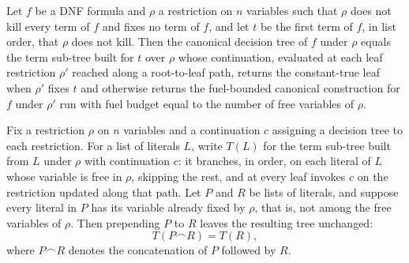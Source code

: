 \begin{lemma}
\label{SwitchingLemma.canonicalDTree_alive_eq_termSubTree'}
\leanok
{}
Let $f$ be a DNF formula and $\rho$ a restriction on $n$ variables such that $\rho$ does
not kill every term of $f$ and fixes no term of $f$, and let $t$ be the first term of
$f$, in list order, that $\rho$ does not kill. Then the canonical decision tree of $f$
under $\rho$ equals the term sub-tree built for $t$ over $\rho$ whose continuation,
evaluated at each leaf restriction $\rho'$ reached along a root-to-leaf path, returns
the constant-true leaf when $\rho'$ fixes $t$ and otherwise returns the fuel-bounded
canonical construction for $f$ under $\rho'$ run with fuel budget equal to the number of
free variables of $\rho$.
\end{lemma}

\begin{lemma}
\label{SwitchingLemma.termSubTree_skip_nonfree_prefix'}
\leanok
{}
Fix a restriction $\rho$ on $n$ variables and a continuation $c$ assigning a decision
tree to each restriction. For a list of literals $L$, write $T(L)$ for the term sub-tree
built from $L$ under $\rho$ with continuation $c$: it branches, in order, on each
literal of $L$ whose variable is free in $\rho$, skipping the rest, and at every leaf
invokes $c$ on the restriction updated along that path. Let $P$ and $R$ be lists of
literals, and suppose every literal in $P$ has its variable already fixed by $\rho$,
that is, not among the free variables of $\rho$. Then prepending $P$ to $R$ leaves the
resulting tree unchanged:
\[
T(P \frown R) = T(R),
\]
where $P \frown R$ denotes the concatenation of $P$ followed by $R$.
\end{lemma}

